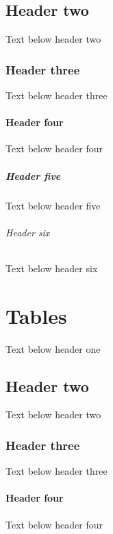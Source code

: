 \documentclass[a4paper,10pt,icelandic]{sphinxmanual}
\begin{document}
\section{Header two}
\label{\detokenize{structural-elements/index:header-two}}
\sphinxAtStartPar
Text below header two


\subsection{Header three}
\label{\detokenize{structural-elements/index:header-three}}
\sphinxAtStartPar
Text below header three


\subsubsection{Header four}
\label{\detokenize{structural-elements/index:header-four}}
\sphinxAtStartPar
Text below header four


\paragraph{Header five}
\label{\detokenize{structural-elements/index:header-five}}
\sphinxAtStartPar
Text below header five


\subparagraph{Header six}
\label{\detokenize{structural-elements/index:header-six}}
\sphinxAtStartPar
Text below header six

\sphinxstepscope


\chapter{Tables}
\label{\detokenize{tables/index:tables}}\label{\detokenize{tables/index::doc}}
\sphinxAtStartPar
Text below header one


\section{Header two}
\label{\detokenize{tables/index:header-two}}
\sphinxAtStartPar
Text below header two


\subsection{Header three}
\label{\detokenize{tables/index:header-three}}
\sphinxAtStartPar
Text below header three


\subsubsection{Header four}
\label{\detokenize{tables/index:header-four}}
\sphinxAtStartPar
Text below header four
\end{document}
